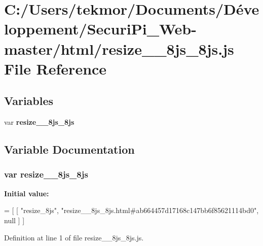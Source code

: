 \section{C\+:/\+Users/tekmor/\+Documents/\+Développement/\+Securi\+Pi\+\_\+\+Web-\/master/html/resize\+\_\+\+\_\+8js\+\_\+8js.js File Reference}
\label{resize____8js__8js_8js}
\subsection*{Variables}
\begin{DoxyCompactItemize}
\item 
var {\bf resize\+\_\+\+\_\+8js\+\_\+8js}
\end{DoxyCompactItemize}


\subsection{Variable Documentation}
\subsubsection[{resize\+\_\+\+\_\+8js\+\_\+8js}]{\setlength{\rightskip}{0pt plus 5cm}var resize\+\_\+\+\_\+8js\+\_\+8js}\label{resize____8js__8js_8js_ad1d2b37c5182495d6001516785baebbd}
{\bfseries Initial value\+:}
\begin{DoxyCode}
=
[
    [ \textcolor{stringliteral}{"resize\_8js"}, \textcolor{stringliteral}{"resize\_\_8js\_8js.html#ab664457d17168c147bb6f85621114bd0"}, null ]
]
\end{DoxyCode}


Definition at line 1 of file resize\+\_\+\+\_\+8js\+\_\+8js.\+js.

